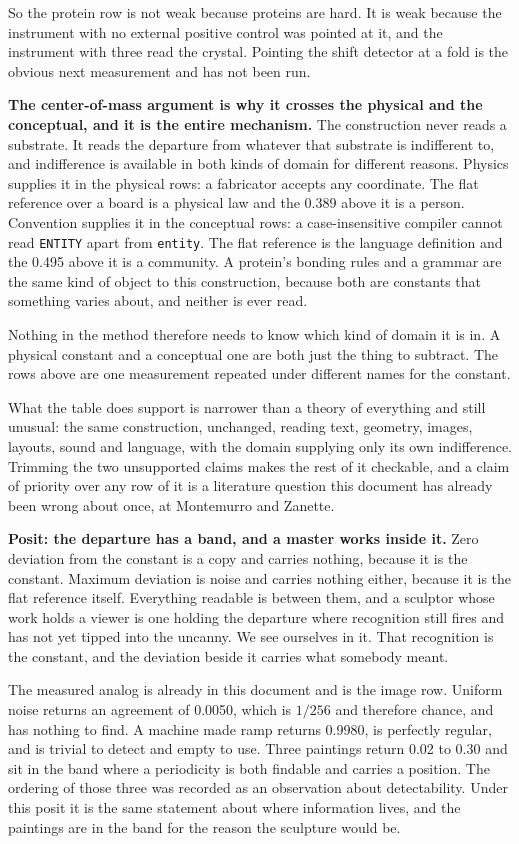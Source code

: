 So the protein row is not weak because proteins are hard. It is weak because the instrument with no external positive control was pointed at it, and the instrument with three read the crystal. Pointing the shift detector at a fold is the obvious next measurement and has not been run.

\textbf{The center-of-mass argument is why it crosses the physical and the conceptual, and it is the entire mechanism.} The construction never reads a substrate. It reads the departure from whatever that substrate is indifferent to, and indifference is available in both kinds of domain for different reasons. Physics supplies it in the physical rows: a fabricator accepts any coordinate. The flat reference over a board is a physical law and the 0.389 above it is a person. Convention supplies it in the conceptual rows: a case-insensitive compiler cannot read \texttt{ENTITY} apart from \texttt{entity}. The flat reference is the language definition and the 0.495 above it is a community. A protein's bonding rules and a grammar are the same kind of object to this construction, because both are constants that something varies about, and neither is ever read.

Nothing in the method therefore needs to know which kind of domain it is in. A physical constant and a conceptual one are both just the thing to subtract. The rows above are one measurement repeated under different names for the constant.

What the table does support is narrower than a theory of everything and still unusual: the same construction, unchanged, reading text, geometry, images, layouts, sound and language, with the domain supplying only its own indifference. Trimming the two unsupported claims makes the rest of it checkable, and a claim of priority over any row of it is a literature question this document has already been wrong about once, at Montemurro and Zanette.

\textbf{Posit: the departure has a band, and a master works inside it.} Zero deviation from the constant is a copy and carries nothing, because it is the constant. Maximum deviation is noise and carries nothing either, because it is the flat reference itself. Everything readable is between them, and a sculptor whose work holds a viewer is one holding the departure where recognition still fires and has not yet tipped into the uncanny. We see ourselves in it. That recognition is the constant, and the deviation beside it carries what somebody meant.

The measured analog is already in this document and is the image row. Uniform noise returns an agreement of 0.0050, which is \(1/256\) and therefore chance, and has nothing to find. A machine made ramp returns 0.9980, is perfectly regular, and is trivial to detect and empty to use. Three paintings return 0.02 to 0.30 and sit in the band where a periodicity is both findable and carries a position. The ordering of those three was recorded as an observation about detectability. Under this posit it is the same statement about where information lives, and the paintings are in the band for the reason the sculpture would be.

